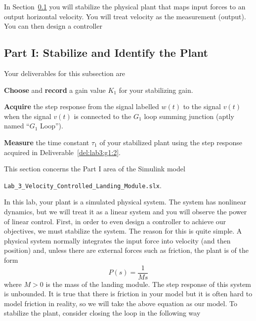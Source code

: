 In Section~\ref{Lab:3:Part:I} you will stabilize the physical plant that maps input forces to an output horizontal velocity.
You will treat velocity as the measurement (output).
You can then design a controller

\subsection{Part I: Stabilize and Identify the Plant}\label{Lab:3:Part:I}
Your deliverables for this subsection are
%
\begin{deliverable}[label={del:lab3:g1:1}]
  \textbf{Choose} and \textbf{record} a gain value \(K_1\) for your stabilizing gain.
\end{deliverable}
%
\begin{deliverable}[label={del:lab3:g1:2}]
   \textbf{Acquire} the step response from the signal labelled \(w(t)\) to the signal \(v(t)\) when the signal \(v(t)\) is connected to the \(G_1\) loop summing junction (aptly named ``\(G_1\) Loop'').
\end{deliverable}
%
\begin{deliverable}[label={del:lab3:g1:3}]
  \textbf{Measure} the time constant \(\tau_1\) of your stabilized plant using the step response acquired in Deliverable~\ref{del:lab3:g1:2}.
\end{deliverable}
%
This section concerns the Part I area of the Simulink model
\begin{center}
  \texttt{Lab\_3\_Velocity\_Controlled\_Landing\_Module.slx}.
\end{center}
In this lab, your plant is a simulated physical system.
The system has nonlinear dynamics, but we will treat it as a linear system and you will observe the power of linear control.
First, in order to even design a controller to achieve our objectives, we must stabilize the system.
The reason for this is quite simple. A physical system normally integrates the input force into velocity (and then position) and, unless there are external forces such as friction, the plant is of the form
\[
  P(s)
    =
      \frac{1}{M s}
\]
where \(M > 0\) is the mass of the landing module.
The step response of this system is unbounded.
It is true that there is friction in your model but it is often hard to model friction in reality, so we will take the above equation as our model.
To stabilize the plant, consider closing the loop in the following way
%
